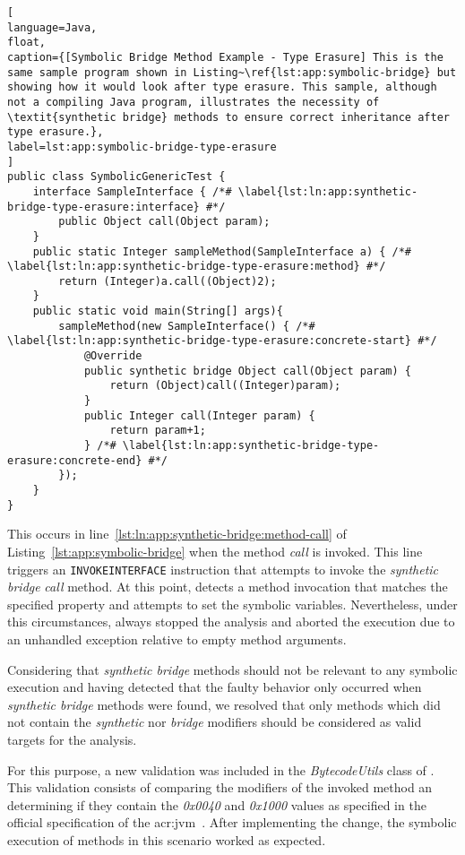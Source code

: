 \begin{lstlisting}[
language=Java,
float,
caption={[Symbolic Bridge Method Example - Type Erasure] This is the same sample program shown in Listing~\ref{lst:app:symbolic-bridge} but showing how it would look after type erasure. This sample, although not a compiling Java program, illustrates the necessity of \textit{synthetic bridge} methods to ensure correct inheritance after type erasure.},
label=lst:app:symbolic-bridge-type-erasure
]
public class SymbolicGenericTest {
	interface SampleInterface { /*# \label{lst:ln:app:synthetic-bridge-type-erasure:interface} #*/
		public Object call(Object param); 
	}
	public static Integer sampleMethod(SampleInterface a) { /*# \label{lst:ln:app:synthetic-bridge-type-erasure:method} #*/
		return (Integer)a.call((Object)2);
	}
	public static void main(String[] args){
		sampleMethod(new SampleInterface() { /*# \label{lst:ln:app:synthetic-bridge-type-erasure:concrete-start} #*/
			@Override
			public synthetic bridge Object call(Object param) {
				return (Object)call((Integer)param);
			}
			public Integer call(Integer param) {				
				return param+1;
			} /*# \label{lst:ln:app:synthetic-bridge-type-erasure:concrete-end} #*/
		});
	}
}
\end{lstlisting}

This occurs in line~\ref{lst:ln:app:synthetic-bridge:method-call} of Listing~\ref{lst:app:symbolic-bridge} when the method \textit{call} is invoked. This line triggers an \texttt{INVOKEINTERFACE} instruction that attempts to invoke the \textit{synthetic bridge} \textit{call} method. At this point, \spf{} detects a method invocation that matches the specified property and attempts to set the symbolic variables. Nevertheless, under this circumstances, \spf{} always stopped the analysis and aborted the execution due to an unhandled exception relative to empty method arguments.

Considering that \textit{synthetic bridge} methods should not be relevant to any symbolic execution and having detected that the faulty behavior only occurred when \textit{synthetic bridge} methods were found, we resolved that only methods which did not contain the \textit{synthetic} nor \textit{bridge} modifiers should be considered as valid targets for the analysis.

For this purpose, a new validation was included in the \textit{BytecodeUtils} class of \spf{}. This validation consists of comparing the modifiers of the invoked method an determining if they contain the \textit{0x0040} and \textit{0x1000} values as specified in the official specification of the \acrshort{acr:jvm}~\cite{Lindholm2014}. After implementing the change, the symbolic execution of methods in this scenario worked as expected. 

